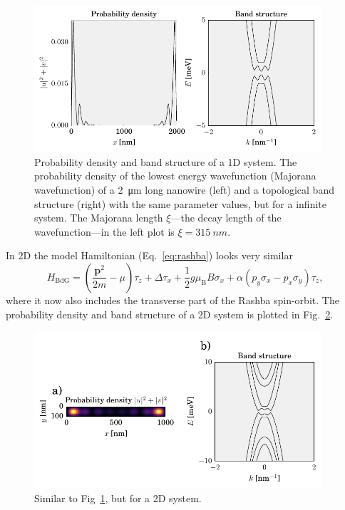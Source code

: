 \begin{figure}
\begin{centering}
\includegraphics[width=0.95\textwidth]{chapter_introduction/figures/wavefunction_1d.pdf}
\par\end{centering}
\caption{Probability density and band structure of a 1D system.
The probability density of the lowest energy wavefunction (Majorana wavefunction) of a \SI{2}{\micro\metre} long nanowire (left) and a topological band structure (right) with the same parameter values, but for a infinite system.
The Majorana length $\xi$---the decay length of the wavefunction---in
the left plot is $\xi=\SI{315}{nm}$.
\label{fig:wavefunction_1d}}
\end{figure}

In 2D the model Hamiltonian (Eq.~\ref{eq:rashba}) looks very similar
\begin{equation}
H_{\textrm{BdG}}=\left(\frac{\bm{p}^{2}}{2m}-\mu\right)\tau_{z}+\Delta\tau_{x}+\frac{1}{2}g\mu_{\textrm{B}}B\sigma_{x}+\alpha\left(p_{y}\sigma_{x}-p_{x}\sigma_{y}\right)\tau_{z},\label{eq:2D_Ham}
\end{equation}
where it now also includes the transverse part of the Rashba spin-orbit.
The probability density and band structure of a 2D system is plotted in Fig.~\ref{fig:wavefunction_2d}.

\begin{figure}
\begin{centering}
\includegraphics[width=0.95\textwidth]{chapter_introduction/figures/wavefunction_2d.pdf}
\par\end{centering}
\caption{Similar to Fig~\ref{fig:wavefunction_1d}, but for a 2D system.
\label{fig:wavefunction_2d}}
\end{figure}


